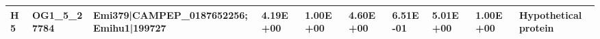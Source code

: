 \begin{landscape}
\begin{center}
\begin{footnotesize}
\begin{longtable}{|p{0.5cm}|p{1.5cm}|p{4cm}|l|l|l|l|l|l|l|}
\textbf{H5}  & OG1\_5\_27784 & Emi379|CAMPEP\_0187652256; Emihu1|199727                                                                                                                                                                                                                                                                                                                                                                                                                                                                                                                                                                                                 & 4.19E+00  & 1.00E+00 & 4.60E+00  & 6.51E-01 & 5.01E+00  & 1.00E+00 & Hypothetical protein                                                         \\ \hline




\end{longtable}
    \end{footnotesize}

\end{center}


\end{landscape}
